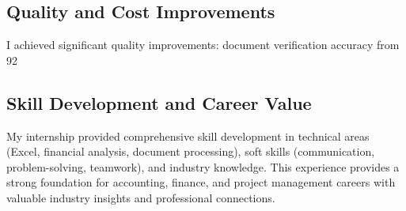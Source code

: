 \subsection{Quality and Cost Improvements}
I achieved significant quality improvements: document verification accuracy from 92%

\subsection{Skill Development and Career Value}
My internship provided comprehensive skill development in technical areas (Excel, financial analysis, document processing), soft skills (communication, problem-solving, teamwork), and industry knowledge. This experience provides a strong foundation for accounting, finance, and project management careers with valuable industry insights and professional connections.
